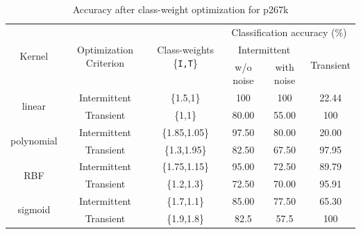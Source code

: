 \begin{table}[h]
\captionsetup{justification=centering}
\begin{tabular}{cccccc}
\hline
\multirow{3}{*}{Kernel}     & \multirow{3}{*}{Optimization Criterion} & \multirow{3}{*}{Class-weights \{\texttt{I,T}\}} & \multicolumn{3}{c}{Classification accuracy (\%)}              \\ \cline{4-6} 
                            &                                         &                                                   & \multicolumn{2}{c}{Intermittent} & \multirow{2}{*}{Transient} \\ \cline{4-5}
                            &                                         &                                                   & w/o noise      & with noise      &                            \\ \hline
\multirow{2}{*}{linear}     & Intermittent                            & \{1.5,1\}                                         & 100            & 100             & 22.44                      \\
                            & Transient                               & \{1,1\}                                           & 80.00          & 55.00           & 100                        \\
\hline
\multirow{2}{*}{polynomial} & Intermittent                            & \{1.85,1.05\}                                     & 97.50          & 80.00           & 20.00                      \\
                            & Transient                               & \{1.3,1.95\}                                      & 82.50          & 67.50           & 97.95                      \\
\hline
\multirow{2}{*}{RBF}        & Intermittent                            & \{1.75,1.15\}                                     & 95.00          & 72.50           & 89.79                      \\
                            & Transient                               & \{1.2,1.3\}                                       & 72.50          & 70.00           & 95.91                      \\
\hline
\multirow{2}{*}{sigmoid}    & Intermittent                            & \{1.7,1.1\}                                       & 85.00          & 77.50           & 65.30                      \\
                            & Transient                               & \{1.9,1.8\}                                       & 82.5           & 57.5            & 100                       \\
\hline
\end{tabular}
\caption{Accuracy after class-weight optimization for p267k}
\label{tab:optp267k}
\end{table}

